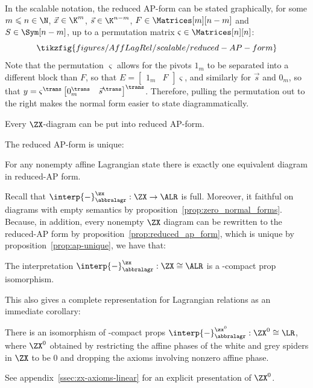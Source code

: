 \begin{remark}
  \label{rem:scalable_reduced_AP-form}
  In the scalable notation, the reduced AP-form can be stated graphically, for some \(m \leqslant n \in \N\), \(\vec{x} \in \K^m\), \(\vec{s} \in
  \K^{n-m}\), \(F \in \Matrices[m][n-m]\) and \(S \in \Sym[n-m]\), up to a permutation matrix \(\varsigma\in \Matrices[n][n]\):
  \begin{equation}
    \label{eq:scalable-reduced-AP-form}
    \tikzfig{figures/AffLagRel/scalable/reduced-AP-form}
  \end{equation}
Note that the permutation \(\varsigma\) allows for the pivots \(1_m\) to be separated into a different block than \(F\), so that \(E=\begin{bmatrix} 1_m & F \end{bmatrix}\varsigma\), and similarly for \(\vec s\) and \(0_m\), so that \(y=\varsigma^\trans \begin{bmatrix} 0_m^\trans & \vec s^\trans \end{bmatrix}^\trans \). Therefore, pulling the permutation out to the right makes  the normal form easier to state diagrammatically.
\end{remark}
\begin{proposition}
  \label{prop:reduced_ap_form}
  Every \(\ZX\)-diagram can be put into reduced AP-form.
\end{proposition}
The reduced AP-form is unique:
\begin{proposition}
  \label{prop:ap-unique}
  For any nonempty affine Lagrangian state there is exactly one equivalent diagram in reduced-AP form.
\end{proposition}
Recall that \(\interp{-}^\zx_\abbralagr:\ZX \to \ALR\) is full.  Moreover, it faithful on diagrams with empty semantics by proposition~\ref{prop:zero_normal_forms}.  Because, in addition,  every nonempty \(\ZX\) diagram can be rewritten to the reduced-AP form by proposition~\ref{prop:reduced_ap_form}, which is unique by proposition~\ref{prop:ap-unique}, we have that:
\begin{theorem}
  \label{thm:equivalence}
  The  interpretation \(\interp{-}^\zx_\abbralagr:\ZX \cong \ALR\) is a \dag-compact prop isomorphism.
\end{theorem}
This also gives a complete representation for Lagrangian relations as an immediate corollary:
\begin{corollary}
There is an isomorphism of \dag-compact props \(\interp{-}^{\zx^0}_\abbralagr:\ZX^0 \cong \LR\), where \(\ZX^0\) obtained by restricting the affine phases of the white and grey spiders in \(\ZX\) to be 0 and dropping the axioms involving nonzero affine phase.
\end{corollary}
See appendix~\ref{ssec:zx-axioms-linear} for an explicit presentation of \(\ZX^0\).
